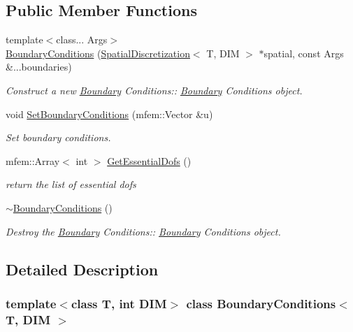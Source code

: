 \subsection*{Public Member Functions}
\begin{DoxyCompactItemize}
\item 
{\footnotesize template$<$class... Args$>$ }\\\hyperlink{classBoundaryConditions_ae9bad35a04c1ef84eb7aa38425d6b044}{Boundary\+Conditions} (\hyperlink{classSpatialDiscretization}{Spatial\+Discretization}$<$ T, D\+IM $>$ $\ast$spatial, const Args \&...boundaries)
\begin{DoxyCompactList}\small\item\em Construct a new \hyperlink{classBoundary}{Boundary} Conditions\+:\+: \hyperlink{classBoundary}{Boundary} Conditions object. \end{DoxyCompactList}\item 
void \hyperlink{classBoundaryConditions_a23f5cf33a22290a61bb2dcba457f086d}{Set\+Boundary\+Conditions} (mfem\+::\+Vector \&u)
\begin{DoxyCompactList}\small\item\em Set boundary conditions. \end{DoxyCompactList}\item 
mfem\+::\+Array$<$ int $>$ \hyperlink{classBoundaryConditions_a3dcecb34a6ac7a00e6f110677145f7c8}{Get\+Essential\+Dofs} ()
\begin{DoxyCompactList}\small\item\em return the list of essential dofs \end{DoxyCompactList}\item 
\mbox{\label{classBoundaryConditions_a50d3971dff965883752e17c05b468756}} 
\hyperlink{classBoundaryConditions_a50d3971dff965883752e17c05b468756}{$\sim$\+Boundary\+Conditions} ()
\begin{DoxyCompactList}\small\item\em Destroy the \hyperlink{classBoundary}{Boundary} Conditions\+:\+: \hyperlink{classBoundary}{Boundary} Conditions object. \end{DoxyCompactList}\end{DoxyCompactItemize}


\subsection{Detailed Description}
\subsubsection*{template$<$class T, int D\+IM$>$\newline
class Boundary\+Conditions$<$ T, D\+I\+M $>$}

